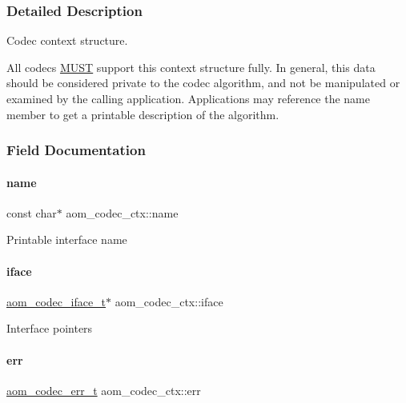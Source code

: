 \subsubsection{Detailed Description}
Codec context structure. 

All codecs \hyperlink{rfc2119_MUST}{M\+U\+ST} support this context structure fully. In general, this data should be considered private to the codec algorithm, and not be manipulated or examined by the calling application. Applications may reference the \textquotesingle{}name\textquotesingle{} member to get a printable description of the algorithm. 

\subsubsection{Field Documentation}
\mbox{\label{structaom__codec__ctx_a3aa8abff3e05d2fbbf4f5a9fa0575f2b}} 
\paragraph{\texorpdfstring{name}{name}}
{\footnotesize\ttfamily const char$\ast$ aom\+\_\+codec\+\_\+ctx\+::name}

Printable interface name \mbox{\label{structaom__codec__ctx_a49c3517c6879e8b57061496078cfd040}} 
\paragraph{\texorpdfstring{iface}{iface}}
{\footnotesize\ttfamily \hyperlink{group__codec_ga4ef55b44c762836d1550e11921bed403}{aom\+\_\+codec\+\_\+iface\+\_\+t}$\ast$ aom\+\_\+codec\+\_\+ctx\+::iface}

Interface pointers \mbox{\label{structaom__codec__ctx_a4cf9c265a7c34e92bb02d04aa3cab718}} 
\paragraph{\texorpdfstring{err}{err}}
{\footnotesize\ttfamily \hyperlink{group__codec_gaaae61e0f8663e6137f1e228757248e7c}{aom\+\_\+codec\+\_\+err\+\_\+t} aom\+\_\+codec\+\_\+ctx\+::err}

